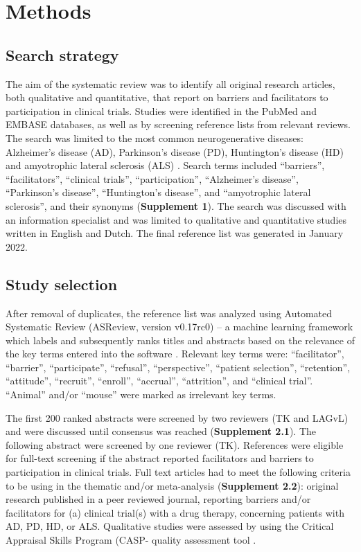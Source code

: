 \documentclass[preprint, 3p,
authoryear]{elsarticle} %
\begin{document}
\hypertarget{methods}{%
\section{Methods}\label{methods}}

\hypertarget{search-strategy}{%
\subsection{Search strategy}\label{search-strategy}}

The aim of the systematic review was to identify all original research
articles, both qualitative and quantitative, that report on barriers and
facilitators to participation in clinical trials. Studies were
identified in the PubMed and EMBASE databases, as well as by screening
reference lists from relevant reviews. The search was limited to the
most common neurogenerative diseases: Alzheimer's disease (AD),
Parkinson's disease (PD), Huntington's disease (HD) and amyotrophic
lateral sclerosis (ALS) \citep{hou2019, zahra2020}. Search terms
included ``barriers'', ``facilitators'', ``clinical trials'',
``participation'', ``Alzheimer's disease'', ``Parkinson's disease'',
``Huntington's disease'', and ``amyotrophic lateral sclerosis'', and
their synonyms (\textbf{Supplement 1}). The search was discussed with an
information specialist and was limited to qualitative and quantitative
studies written in English and Dutch. The final reference list was
generated in January 2022.

\hypertarget{study-selection}{%
\subsection{Study selection}\label{study-selection}}

After removal of duplicates, the reference list was analyzed using
Automated Systematic Review (ASReview, version v0.17rc0) -- a machine
learning framework which labels and subsequently ranks titles and
abstracts based on the relevance of the key terms entered into the
software \citep{vandeschoot2021}. Relevant key terms were:
``facilitator'', ``barrier'', ``participate'', ``refusal'',
``perspective'', ``patient selection'', ``retention'', ``attitude'',
``recruit'', ``enroll'', ``accrual'', ``attrition'', and ``clinical
trial''. ``Animal'' and/or ``mouse'' were marked as irrelevant key
terms.

The first 200 ranked abstracts were screened by two reviewers (TK and
LAGvL) and were discussed until consensus was reached
(\textbf{Supplement 2.1}). The following abstract were screened by one
reviewer (TK). References were eligible for full-text screening if the
abstract reported facilitators and barriers to participation in clinical
trials. Full text articles had to meet the following criteria to be
using in the thematic and/or meta-analysis (\textbf{Supplement 2.2}):
original research published in a peer reviewed journal, reporting
barriers and/or facilitators for (a) clinical trial(s) with a drug
therapy, concerning patients with AD, PD, HD, or ALS. Qualitative
studies were assessed by using the Critical Appraisal Skills Program
(CASP- quality assessment tool \citep{casp2018}.
\end{document}
